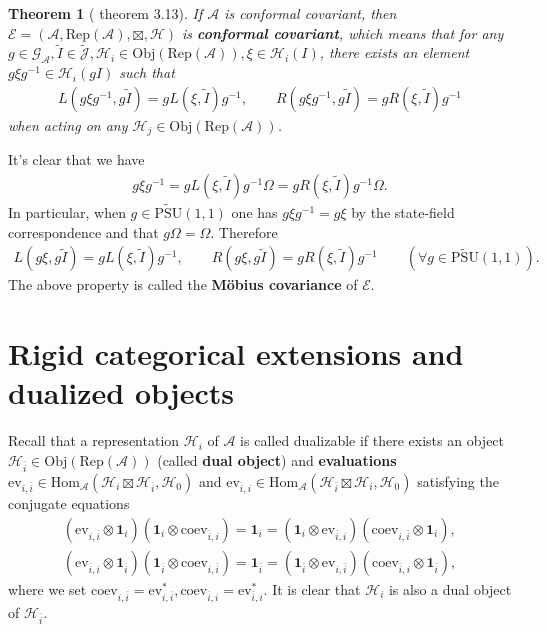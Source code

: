 \documentclass[12pt,a4paper]{article}
\theoremstyle{definition}
\theoremstyle{plain}
\newtheorem{thm}[df]{Theorem}
\newcommand{\mc}{\mathcal}
\newcommand{\wtd}{\widetilde}
\newcommand{\ovl}{\overline}
\newcommand{\id}{\mathbf{1}}
\newcommand{\Hom}{\mathrm{Hom}}
\newcommand{\ev}{\mathrm{ev}}
\newcommand{\coev}{\mathrm{coev}}
\newcommand{\UPSU}{\widetilde{\mathrm{PSU}}(1,1)}
\newcommand{\GA}{\mathscr G_{\mathcal A}}
\newcommand{\scr}{\mathscr}
\newcommand{\RepA}{\mathrm{Rep}(\mc A)}
\newcommand{\Obj}{\mathrm{Obj}}
\numberwithin{equation}{section}
\begin{document}
\begin{thm}[\cite{Gui21a} theorem 3.13]\label{lb2}
If $\mc A$ is conformal covariant, then $\scr E=(\mc A,\RepA,\boxtimes,\mc H)$ is \textbf{conformal covariant}, which means that for any $g\in\GA,\wtd I\in\wtd{\mc J},\mc H_i\in\Obj(\RepA),\xi\in\mc H_i(I)$, there exists an element $g\xi g^{-1}\in\mc H_i(g I)$ such that
\begin{align}
L(g\xi g^{-1},g\wtd I)=gL(\xi,\wtd I)g^{-1},\qquad R(g\xi g^{-1},g\wtd I)=gR(\xi,\wtd I)g^{-1}\label{eq1}
\end{align}
when acting on any $\mc H_j\in\Obj(\RepA)$.
\end{thm}
It's clear that we have
\begin{align}
g\xi g^{-1}=gL(\xi,\wtd I)g^{-1}\Omega=gR(\xi,\wtd I)g^{-1}\Omega.
\end{align}
In particular, when $g\in\UPSU$ one has $g\xi g^{-1}=g\xi$ by the state-field correspondence and that $g\Omega=\Omega$. Therefore
\begin{align}
L(g\xi,g\wtd I)=gL(\xi,\wtd I)g^{-1},\qquad R(g\xi,g\wtd I)=gR(\xi,\wtd I)g^{-1}\qquad(\forall g\in\UPSU).\label{eq2}
\end{align}
The above property is called the \textbf{M\"obius covariance} of $\scr E$.



\section{Rigid categorical extensions and dualized objects}\label{lb30}


Recall that a representation $\mc H_i$ of $\mc A$ is called dualizable if there exists an object $\mc H_{\ovl i}\in\Obj(\RepA)$ (called \textbf{dual object}) and \textbf{evaluations} $\ev_{i,\ovl i}\in\Hom_{\mc A}(\mc H_i\boxtimes\mc H_{\ovl i},\mc H_0)$ and $\ev_{\ovl i,i}\in\Hom_{\mc A}(\mc H_{\ovl i}\boxtimes\mc H_i,\mc H_0)$  satisfying the conjugate equations
\begin{gather}
	(\ev_{i,\ovl i}\otimes\id_i)(\id_i\otimes\coev_{\ovl i,i})=\id_i=(\id_i\otimes\ev_{\ovl i,i})(\coev_{i,\ovl i}\otimes\id_i),\label{eq3}\\
	(\ev_{\ovl i,i}\otimes\id_{\ovl i})(\id_{\ovl i}\otimes\coev_{i,\ovl i})=\id_{\ovl i}=(\id_{\ovl i}\otimes\ev_{i,\ovl i})(\coev_{\ovl i,i}\otimes\id_{\ovl i}),\label{eq4}
\end{gather}
where we set $\coev_{i,\ovl i}=\ev_{i,\ovl i}^*,\coev_{\ovl i,i}=\ev_{\ovl i,i}^*$. It is clear that $\mc H_i$ is also a dual object of $\mc H_{\ovl i}$. 
\end{document}

